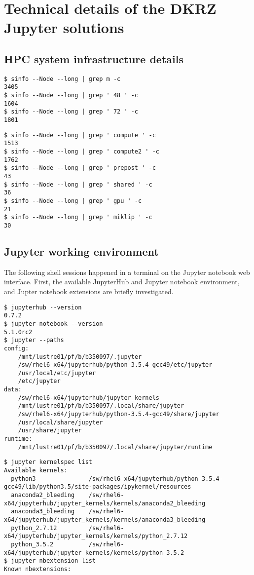 \section{Technical details of the DKRZ Jupyter solutions}
\label{app:dkrz-jupyter}

\subsection{HPC system infrastructure details}
\label{app:dkrz-infrastructure}

\begin{verbatim}
$ sinfo --Node --long | grep m -c
3405
$ sinfo --Node --long | grep ' 48 ' -c
1604
$ sinfo --Node --long | grep ' 72 ' -c
1801
\end{verbatim}

\begin{verbatim}
$ sinfo --Node --long | grep ' compute ' -c
1513
$ sinfo --Node --long | grep ' compute2 ' -c
1762
$ sinfo --Node --long | grep ' prepost ' -c
43
$ sinfo --Node --long | grep ' shared ' -c
36
$ sinfo --Node --long | grep ' gpu ' -c
21
$ sinfo --Node --long | grep ' miklip ' -c
30
\end{verbatim}

\subsection{Jupyter working environment}
\label{app:dkrz-jupyter-env}

The following shell sessions happened in a terminal on the Jupyter notebook web interface.
First, the available JupyterHub and Jupyter notebook environment, and Jupter notebook extensions are briefly investigated.

\begin{verbatim}
$ jupyterhub --version
0.7.2
$ jupyter-notebook --version
5.1.0rc2
$ jupyter --paths
config:
    /mnt/lustre01/pf/b/b350097/.jupyter
    /sw/rhel6-x64/jupyterhub/python-3.5.4-gcc49/etc/jupyter
    /usr/local/etc/jupyter
    /etc/jupyter
data:
    /sw/rhel6-x64/jupyterhub/jupyter_kernels
    /mnt/lustre01/pf/b/b350097/.local/share/jupyter
    /sw/rhel6-x64/jupyterhub/python-3.5.4-gcc49/share/jupyter
    /usr/local/share/jupyter
    /usr/share/jupyter
runtime:
    /mnt/lustre01/pf/b/b350097/.local/share/jupyter/runtime
\end{verbatim}

\begin{verbatim}
$ jupyter kernelspec list
Available kernels:
  python3               /sw/rhel6-x64/jupyterhub/python-3.5.4-gcc49/lib/python3.5/site-packages/ipykernel/resources
  anaconda2_bleeding    /sw/rhel6-x64/jupyterhub/jupyter_kernels/kernels/anaconda2_bleeding
  anaconda3_bleeding    /sw/rhel6-x64/jupyterhub/jupyter_kernels/kernels/anaconda3_bleeding
  python_2.7.12         /sw/rhel6-x64/jupyterhub/jupyter_kernels/kernels/python_2.7.12
  python_3.5.2          /sw/rhel6-x64/jupyterhub/jupyter_kernels/kernels/python_3.5.2
$ jupyter nbextension list
Known nbextensions:
\end{verbatim}

